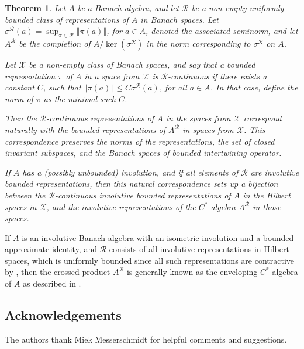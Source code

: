 \documentclass{amsart}
\theoremstyle{plain}
\newtheorem{theorem}{Theorem}[section]
\theoremstyle{definition}
\numberwithin{equation}{section}
\begin{document}
\begin{theorem}
Let $A$ be a Banach algebra, and let ${\mathcal R}$ be a non-empty uniformly bounded class of representations of $A$ in Banach spaces. Let ${\sigma^{\mathcal R}}(a)=\sup_{\pi \in {\mathcal R}}{\left\Vert {\pi(a)} \right\Vert}$, for $a\in A$, denoted the associated seminorm, and let $A^{\mathcal R}$ be the completion of $A/\ker({\sigma^{\mathcal R}})$ in the norm corresponding to ${\sigma^{\mathcal R}}$ on $A$.

Let ${\mathcal X}$ be a non-empty class of Banach spaces, and say that a bounded representation $\pi$ of $A$ in a space from ${\mathcal X}$ is ${\mathcal R}$-continuous if there exists a constant $C$, such that ${\left\Vert {\pi(a)} \right\Vert}\leq C{\sigma^{\mathcal R}}(a)$, for all $a\in A$. In that case, define the norm of $\pi$ as the minimal such $C$.

Then the ${\mathcal R}$-continuous representations of $A$ in the spaces from ${\mathcal X}$ correspond naturally with the bounded representations of $A^{\mathcal R}$ in spaces from ${\mathcal X}$. This correspondence preserves the norms of the representations, the set of closed invariant subspaces, and the Banach spaces of bounded intertwining operator.

If $A$ has a \textup{(}possibly unbounded\textup{)} involution, and if all elements of ${\mathcal R}$ are involutive bounded representations, then this natural correspondence sets up a bijection between the ${\mathcal R}$-continuous involutive bounded representations of $A$ in the Hilbert spaces in ${\mathcal X}$, and the involutive representations of the $C^*$-algebra $A^{\mathcal R}$ in those spaces.
\end{theorem}

If $A$ is an involutive Banach algebra with an isometric involution and a bounded approximate identity, and ${\mathcal R}$ consists of all involutive representations in Hilbert spaces, which is uniformly bounded since all such representations are contractive by \cite[Proposition~1.3.7]{dixmier}, then the crossed product $A^{\mathcal R}$ is generally known as the enveloping $C^*$-algebra of $A$ as described in \cite[Section~2.7]{dixmier}.

\subsection*{Acknowledgements}
The authors thank Miek Messerschmidt for helpful comments and suggestions.



\end{document}
